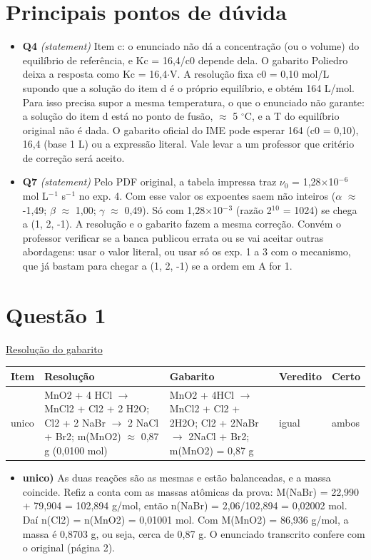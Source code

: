 \documentclass{article}%
\begin{document}
\section*{Principais pontos de dúvida}%
\begin{itemize}%
\item%
\textbf{Q4} \textit{(statement)} Item c: o enunciado não dá a concentração (ou o volume) do equilíbrio de referência, e Kc = 16,4/c0 depende dela. O gabarito Poliedro deixa a resposta como Kc = 16,4$\cdot$V. A resolução fixa c0 = 0,10 mol/L supondo que a solução do item d é o próprio equilíbrio, e obtém 164 L/mol. Para isso precisa supor a mesma temperatura, o que o enunciado não garante: a solução do item d está no ponto de fusão, $\approx$ 5 $^\circ$C, e a T do equilíbrio original não é dada. O gabarito oficial do IME pode esperar 164 (c0 = 0,10), 16,4 (base 1 L) ou a expressão literal. Vale levar a um professor que critério de correção será aceito.%
\item%
\textbf{Q7} \textit{(statement)} Pelo PDF original, a tabela impressa traz $\nu$$_{0}$ = 1,28$\times$10$^{-}$$^{6}$ mol L$^{-}$$^{1}$ s$^{-}$$^{1}$ no exp. 4. Com esse valor os expoentes saem não inteiros ($\alpha$ $\approx$ -1,49; $\beta$ $\approx$ 1,00; $\gamma$ $\approx$ 0,49). Só com 1,28$\times$10$^{-}$$^3$ (razão 2$^{1}$$^{0}$ = 1024) se chega a (1, 2, -1). A resolução e o gabarito fazem a mesma correção. Convém o professor verificar se a banca publicou errata ou se vai aceitar outras abordagens: usar o valor literal, ou usar só os exp. 1 a 3 com o mecanismo, que já bastam para chegar a (1, 2, -1) se a ordem em A for 1.%
\end{itemize}%
\section*{Questão 1}%
\href{https://poliedroresolve.sistemapoliedro.com.br/vestibulares/ime/2027/ime-2-fase-dia-3-28-10-2026-2-fase-dia-3/dissertativa-1-quimica-2-fase-dia-3-ime-2027}{Resolução do gabarito}\par\smallskip%
\begin{longtable}{@{}p{} p{} p{} p{} p{}@{}}\toprule Item & Resolução & Gabarito & Veredito & Certo \\ \midrule
unico & MnO2 + 4 HCl $\to$ MnCl2 + Cl2 + 2 H2O; Cl2 + 2 NaBr $\to$ 2 NaCl + Br2; m(MnO2) $\approx$ 0,87 g (0,0100 mol) & MnO2 + 4HCl $\to$ MnCl2 + Cl2 + 2H2O; Cl2 + 2NaBr $\to$ 2NaCl + Br2; m(MnO2) = 0,87 g & igual & ambos \\
\bottomrule\end{longtable}%
\begin{itemize}%
\item%
\textbf{unico)} As duas reações são as mesmas e estão balanceadas, e a massa coincide. Refiz a conta com as massas atômicas da prova: M(NaBr) = 22,990 + 79,904 = 102,894 g/mol, então n(NaBr) = 2,06/102,894 = 0,02002 mol. Daí n(Cl2) = n(MnO2) = 0,01001 mol. Com M(MnO2) = 86,936 g/mol, a massa é 0,8703 g, ou seja, cerca de 0,87 g. O enunciado transcrito confere com o original (página 2).%
\end{itemize}%
\end{document}
